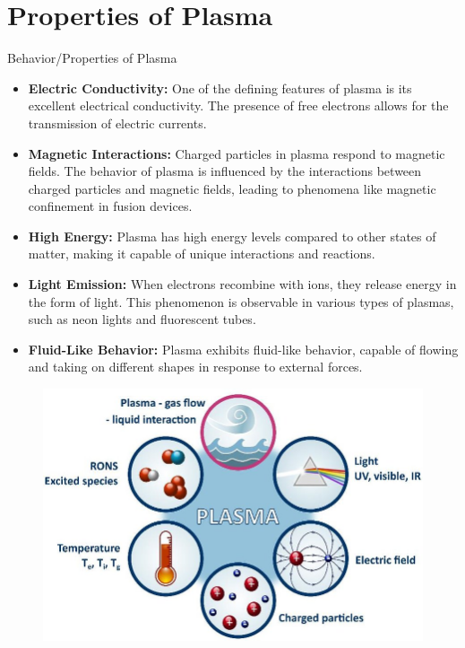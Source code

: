 \documentclass[13pt]{beamer}
\begin{document}
     \section{Properties of Plasma}
	\begin{frame}[t,allowframebreaks]{Behavior/Properties of Plasma}

		\begin{itemize}
			\item 	\textbf{Electric Conductivity: }One of the defining features of plasma is its excellent electrical conductivity.
			The presence of free electrons allows for the transmission of electric currents.

			\item \textbf{Magnetic Interactions:} Charged particles in plasma respond to magnetic fields. The behavior of plasma is influenced by the interactions between charged particles and magnetic fields, leading to phenomena like magnetic confinement in fusion devices.


		\item \textbf{High Energy:} Plasma has high energy levels compared to other states of matter, making it capable of unique interactions and reactions.

			\item \textbf{Light Emission:} When electrons recombine with ions, they release energy in the form of light. This phenomenon is observable in various types of plasmas, such as neon lights and fluorescent tubes.

			\item \textbf{Fluid-Like Behavior: }Plasma exhibits fluid-like behavior, capable of flowing and taking on different shapes in response to external forces.


		\end{itemize}


	\begin{figure}
	\centering
	\includegraphics[width = \textwidth]{Images/props.png}
\end{figure}

	\end{frame}
\end{document}
